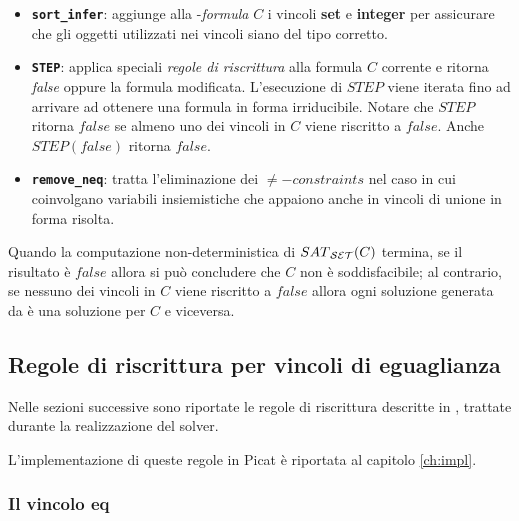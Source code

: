 \documentclass[12pt,a4paper,openright]{book} %
\begin{document}
\begin{itemize}
	\item \textbf{\texttt{sort\_infer}}: aggiunge alla
          \calset{}-\textit{formula} $C$ i vincoli \textbf{set} e
          \textbf{integer} per assicurare che gli oggetti utilizzati
          nei vincoli siano del tipo corretto.

	\item \textbf{\texttt{STEP}}: applica speciali \textit{regole
          di riscrittura} alla formula $C$ corrente e ritorna
          \textit{false} oppure la formula modificata. L'esecuzione di
          $STEP$ viene iterata fino ad arrivare ad ottenere una
          formula in forma irriducibile. Notare che $STEP$ ritorna
          $false$ se almeno uno dei vincoli in $C$ viene riscritto a
          $false$. Anche $STEP(false)$ ritorna $false$.

	\item \textbf{\texttt{remove\_neq}}: tratta l'eliminazione dei
          $\neq-constraints$ nel caso in cui coinvolgano variabili
          insiemistiche che appaiono anche in vincoli di unione in
          forma risolta.
\end{itemize}

Quando la computazione non-deterministica di $SAT\textsubscript{\ensuremath{\mathcal{S}}\ensuremath{\mathcal{E}}\ensuremath{\mathcal{T}}}{}(C)$ termina,
se il risultato è $false$ allora si può concludere che $C$ non è
soddisfacibile; al contrario, se nessuno dei vincoli in $C$ viene
riscritto a $false$ allora ogni soluzione generata da \satset{} è una
soluzione per $C$ e viceversa.

\subsection{Regole di riscrittura per vincoli di eguaglianza}
\label{subsec:clpbasedlang_lset_rewriteeq}


Nelle sezioni successive sono riportate le regole di riscrittura
descritte in \cite{Rossi18}, trattate durante la realizzazione del
solver.

L'implementazione di queste regole in Picat è riportata al capitolo
\ref{ch:impl}.

\subsubsection{Il vincolo eq}
\end{document}
